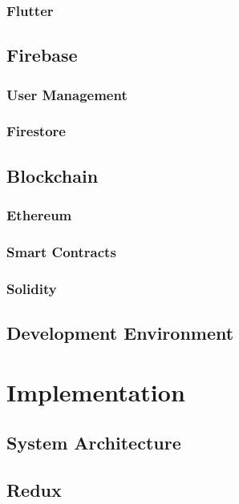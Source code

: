 \documentclass[a4paper,12pt]{report}
\begin{document}
\subsection{Flutter}

\section{Firebase}

\subsection{User Management}

\subsection{Firestore}

\section{Blockchain}

\subsection{Ethereum}

\subsection{Smart Contracts}

\subsection{Solidity}

\section{Development Environment}

\chapter{Implementation}

\section{System Architecture}

\section{Redux}
\end{document}
